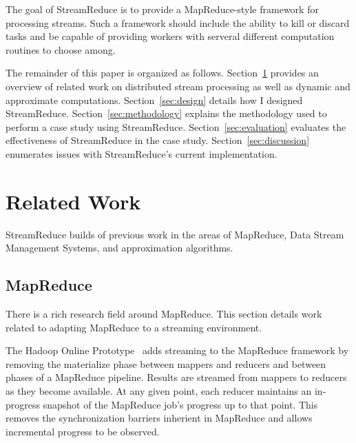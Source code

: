 \documentclass[12pt,twocolumn]{article}
\begin{document}
The goal of StreamReduce is to provide a MapReduce-style framework for processing streams. Such a
framework should include the ability to kill or discard tasks and be capable of
providing workers with serveral different computation routines to choose among.

The remainder of this paper is organized as follows. Section~\ref{sec:relwork} provides
an overview of related work on distributed stream processing as well as dynamic and
approximate computations. Section~\ref{sec:design} details how I designed StreamReduce.
Section~\ref{sec:methodology} explains the methodology used to perform a case study
using StreamReduce. Section~\ref{sec:evaluation} evaluates the effectiveness of StreamReduce in the case study.
Section~\ref{sec:discussion} enumerates issues with StreamReduce's current implementation.

\section{Related Work}
\label{sec:relwork}
%

StreamReduce builds of previous work in the areas of MapReduce, Data Stream Management Systems,
and approximation algorithms.

\subsection{MapReduce}
There is a rich research field around MapReduce. This section details work related to adapting
MapReduce to a streaming environment.

The Hadoop Online Prototype~\cite{Condie:EECS-2009-136} adds streaming to the MapReduce framework
by removing the materialize phase between mappers and reducers and between phases of a
MapReduce pipeline. Results are streamed from mappers to reducers as they become available.
At any given point, each reducer maintains an in-progress snapshot of the MapReduce job's
progress up to that point. This removes the synchronization barriers inherient in MapReduce
and allows incremental progress to be observed.
\end{document}
